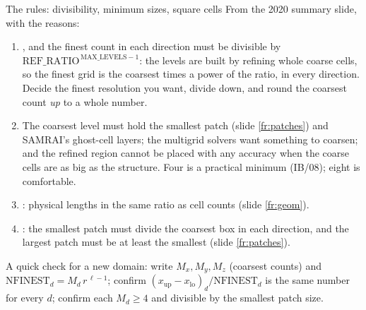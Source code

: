 \documentclass[aspectratio=169,11pt]{beamer}
\begin{document}
\begin{frame}{The rules: divisibility, minimum sizes, square cells}
\label{fr:rules}
\footnotesize From the 2020 summary slide, with the reasons:
\begin{enumerate}
  \item {}, and the finest count in each direction must be divisible by $\mathrm{REF\_RATIO}^{\,\mathrm{MAX\_LEVELS}-1}$: the levels are built by refining whole coarse cells, so the finest grid is the coarsest times a power of the ratio, in every direction. Decide the finest resolution you want, divide down, and round the coarsest count \emph{up} to a whole number.
  \item {} The coarsest level must hold the smallest patch (slide \ref{fr:patches}) and SAMRAI's ghost-cell layers; the multigrid solvers want something to coarsen; and the refined region cannot be placed with any accuracy when the coarse cells are as big as the structure. Four is a practical minimum (IB/08); eight is comfortable.
  \item {}: physical lengths in the same ratio as cell counts (slide \ref{fr:geom}).
  \item {}: the smallest patch must divide the coarsest box in each direction, and the largest patch must be at least the smallest (slide \ref{fr:patches}).
\end{enumerate}
\vspace{1mm}
\begin{punchbox}
\footnotesize A quick check for a new domain: write $M_x, M_y, M_z$ (coarsest counts) and $\mathrm{NFINEST}_d = M_d\,r^{\,\ell-1}$; confirm $(x_{\mathrm{up}} - x_{\mathrm{lo}})_d / \mathrm{NFINEST}_d$ is the same number for every $d$; confirm each $M_d \ge 4$ and divisible by the smallest patch size.
\end{punchbox}
\end{frame}
\end{document}
